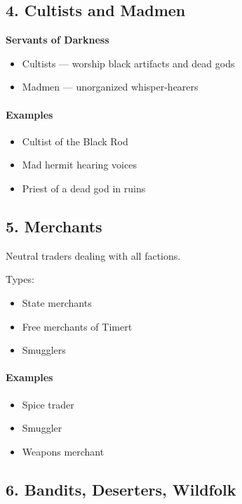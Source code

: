 \subsection{4. Cultists and Madmen}

\textbf{Servants of Darkness}

\begin{itemize}
\item Cultists — worship black artifacts and dead gods
\item Madmen — unorganized whisper-hearers
\end{itemize}

\paragraph{Examples}
\begin{itemize}
\item Cultist of the Black Rod
\item Mad hermit hearing voices
\item Priest of a dead god in ruins
\end{itemize}



\subsection{5. Merchants}

Neutral traders dealing with all factions.

Types:

\begin{itemize}
\item State merchants
\item Free merchants of Timert
\item Smugglers
\end{itemize}

\paragraph{Examples}
\begin{itemize}
\item Spice trader
\item Smuggler
\item Weapons merchant
\end{itemize}



\subsection{6. Bandits, Deserters, Wildfolk}

